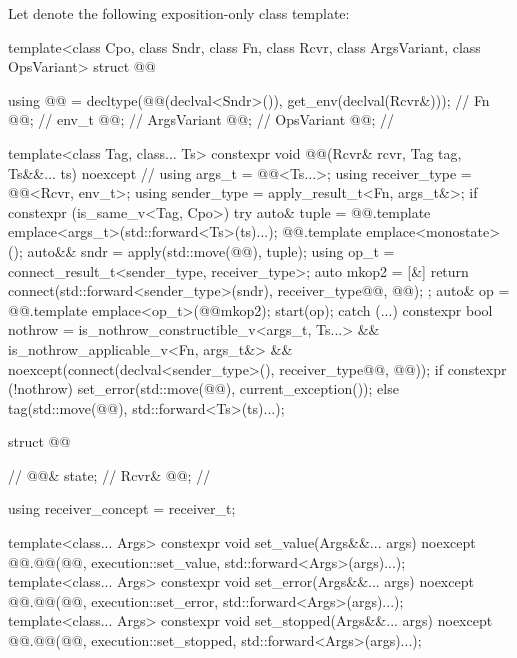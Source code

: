 \pnum
Let  denote the following exposition-only class template:
\begin{codeblock}
template<class Cpo, class Sndr, class Fn, class Rcvr, class ArgsVariant, class OpsVariant>
struct @@ {
  using @@ = decltype(@@(declval<Sndr>()), get_env(declval(Rcvr&)));    // \expos
  Fn @@;                                                                        // \expos
  env_t @@;                                                                    // \expos
  ArgsVariant @@;                                                             // \expos
  OpsVariant @@;                                                               // \expos

  template<class Tag, class... Ts>
  constexpr void @@(Rcvr& rcvr, Tag tag, Ts&&... ts) noexcept // \expos
  {
    using args_t = @@<Ts...>;
    using receiver_type = @@<Rcvr, env_t>;
    using sender_type = apply_result_t<Fn, args_t&>;
    if constexpr (is_same_v<Tag, Cpo>) {
      try {
        auto& tuple = @@.template emplace<args_t>(std::forward<Ts>(ts)...);
        @@.template emplace<monostate>();
        auto&& sndr = apply(std::move(@@), tuple);
        using op_t = connect_result_t<sender_type, receiver_type>;
        auto mkop2 = [&] {
          return connect(std::forward<sender_type>(sndr),
          receiver_type{@@, @@});
        };
        auto& op = @@.template emplace<op_t>(@@{mkop2});
        start(op);
      } catch (...) {
        constexpr bool nothrow =
          is_nothrow_constructible_v<args_t, Ts...> &&
          is_nothrow_applicable_v<Fn, args_t&> &&
          noexcept(connect(declval<sender_type>(), receiver_type{@@, @@}));
        if constexpr (!nothrow) {
          set_error(std::move(@@), current_exception());
        }
      }
    } else {
      tag(std::move(@@), std::forward<Ts>(ts)...);
    }
  }

  struct @@ {     // \expos
    @@& state;   // \expos
    Rcvr& @@;         // \expos

    using receiver_concept = receiver_t;

    template<class... Args>
    constexpr void set_value(Args&&... args) noexcept {
      @@.@@(@@, execution::set_value, std::forward<Args>(args)...);
    }
    template<class... Args>
    constexpr void set_error(Args&&... args) noexcept {
      @@.@@(@@, execution::set_error, std::forward<Args>(args)...);
    }
    template<class... Args>
    constexpr void set_stopped(Args&&... args) noexcept {
      @@.@@(@@, execution::set_stopped, std::forward<Args>(args)...);
    }

}}
\end{codeblock}
